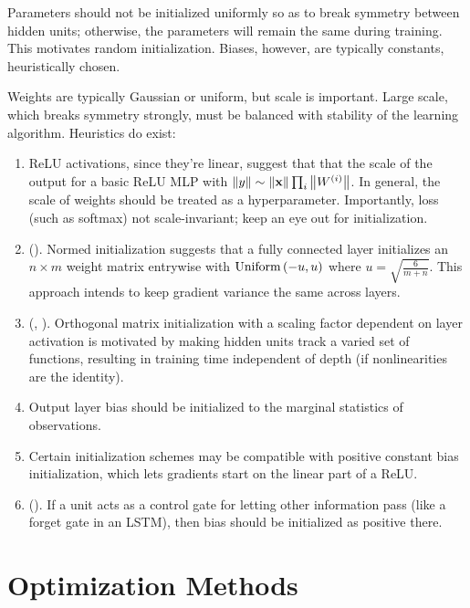 \documentclass{article}
\begin{document}
Parameters should not be initialized uniformly so as to break symmetry between hidden units; otherwise, the parameters will remain the same during training. This motivates random initialization. Biases, however, are typically constants, heuristically chosen.

Weights are typically Gaussian or uniform, but scale is important. Large scale, which breaks symmetry strongly, must be balanced with stability of the learning algorithm. Heuristics do exist:

\begin{enumerate}
\item ReLU activations, since they're linear, suggest that that the scale of the output for a basic ReLU MLP with $\left\| y \right\|\sim \left\| \textbf{x} \right\|\prod_i\left\| W^{(i)} \right\|$. In general, the scale of weights should be treated as a hyperparameter. Importantly, loss (such as softmax) not scale-invariant; keep an eye out for initialization.
\item (). Normed initialization suggests that a fully connected layer initializes an $n\times m$ weight matrix entrywise with $\operatorname{Uniform}\left({-u, u}\right)$ where $u=\sqrt{\frac{6}{m+n}}$. This approach intends to keep gradient variance the same across layers.
\item (, ). Orthogonal matrix initialization with a scaling factor dependent on layer activation is motivated by making hidden units track a varied set of functions, resulting in training time independent of depth (if nonlinearities are the identity).
\item Output layer bias should be initialized to the marginal statistics of observations.
\item Certain initialization schemes may be compatible with positive constant bias initialization, which lets gradients start on the linear part of a ReLU.
\item (). If a unit acts as a control gate for letting other information pass (like a forget gate in an LSTM), then bias should be initialized as positive there.
\end{enumerate}

\section{Optimization Methods}
\end{document}
